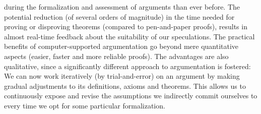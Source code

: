 \begin{isabellebody}
\begin{isamarkuptext}
{during the formalization and assessment of arguments than ever before. The potential reduction (of several orders of magnitude)
in the time needed for proving or disproving theorems (compared to pen-and-paper proofs), results in almost real-time
feedback about the suitability of our speculations. The practical benefits of computer-supported argumentation go beyond
mere quantitative aspects (easier, faster and more reliable proofs). The advantages are also qualitative,
since a significantly different approach to argumentation is fostered: We can now work iteratively (by trial-and-error)
on an argument by making gradual adjustments to its definitions, axioms and theorems. This allows us to continuously
expose and revise the assumptions we indirectly commit ourselves to every time we opt for some particular formalization.
}%
\end{isamarkuptext}\isamarkuptrue%
%
%
%
%
%
%
%
\end{isabellebody}%
